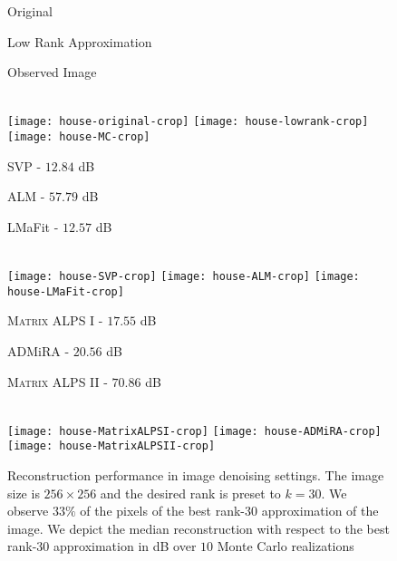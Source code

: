 \documentclass[twocolumn]{svjour3}
\newcommand{\rank}{k}
\begin{document}
\begin{figure*}[!htp]
\centering
\begin{minipage}{0.28\linewidth}
\centering \normalsize{Original}
\end{minipage} 
\begin{minipage}{0.28\linewidth}
\centering \normalsize{Low Rank Approximation}
\end{minipage}
\begin{minipage}{0.28\linewidth}
\centering \normalsize{Observed Image}
\end{minipage} \vspace{0.1cm}\\

\texttt{[image: house-original-crop]} 
\texttt{[image: house-lowrank-crop]} 
\texttt{[image: house-MC-crop]}\\

\centering
\begin{minipage}{0.28\linewidth}
\centering \normalsize{SVP - $12.84$ dB}
\end{minipage} 
\begin{minipage}{0.28\linewidth}
\centering \normalsize{ALM - $57.79$ dB}
\end{minipage}
\begin{minipage}{0.28\linewidth}
\centering \normalsize{LMaFit - $12.57$ dB}
\end{minipage} \vspace{0.1cm}\\

\texttt{[image: house-SVP-crop]} 
\texttt{[image: house-ALM-crop]} 
\texttt{[image: house-LMaFit-crop]} \\

\centering
\begin{minipage}{0.28\linewidth}
\centering \normalsize{\textsc{\textsc{Matrix ALPS I}} - $17.55$ dB}
\end{minipage} 
\begin{minipage}{0.28\linewidth}
\centering \normalsize{ADMiRA - $20.56$ dB}
\end{minipage}
\begin{minipage}{0.28\linewidth}
\centering \normalsize{\textsc{\textsc{Matrix ALPS II}} - $70.86$ dB}
\end{minipage} \vspace{0.1cm}\\

\texttt{[image: house-MatrixALPSI-crop]} 
\texttt{[image: house-ADMiRA-crop]} 
\texttt{[image: house-MatrixALPSII-crop]}\\
\caption{\small{Reconstruction performance in image denoising settings. The image size is $256 \times 256$ and the desired rank is preset to $\rank = 30$. We observe $33\%$ of the pixels of the best rank-$ 30 $ approximation of the image. We depict the median reconstruction with respect to the best rank-$30$ approximation in dB over $10$ Monte Carlo realizations}} {\label{fig:real2}}
\end{figure*}
\end{document}
